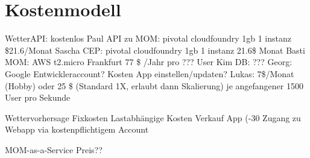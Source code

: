 \section{Kostenmodell}

WetterAPI: kostenlos
Paul API zu MOM: pivotal cloudfoundry 1gb 1 instanz 	\$21.6/Monat
Sascha CEP: pivotal cloudfoundry 1gb 1 instanz 21.6\$ Monat
Basti MOM: AWS t2.micro Frankfurt	 77 \$ /Jahr pro ??? User
Kim DB: ???
Georg:  Google Entwickleraccount? Kosten App einstellen/updaten?
Lukas: 7\$/Monat (Hobby) oder 25 \$ (Standard 1X, erlaubt dann Skalierung) je angefangener 1500 User pro Sekunde


Wettervorhersage
Fixkosten
Lastabhängige Kosten
Verkauf App (-30%
Zugang zu Webapp via kostenpflichtigem Account

MOM-as-a-Service
Preis?? 